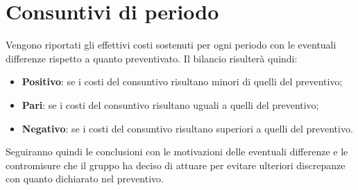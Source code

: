 \section{Consuntivi di periodo}
Vengono riportati gli effettivi costi sostenuti per ogni periodo con le eventuali differenze rispetto a quanto preventivato. Il bilancio risulterà quindi:
\begin{itemize}
	\item \textbf{Positivo}: se i costi del consuntivo risultano minori di quelli del preventivo;
	\item \textbf{Pari}: se i costi del consuntivo risultano uguali a quelli del preventivo;
	\item \textbf{Negativo}: se i costi del consuntivo risultano superiori a quelli del preventivo.
\end{itemize}
Seguiranno quindi le conclusioni con le motivazioni delle eventuali differenze e le contromisure che il gruppo ha deciso di attuare per evitare ulteriori discrepanze con quanto dichiarato nel preventivo.
